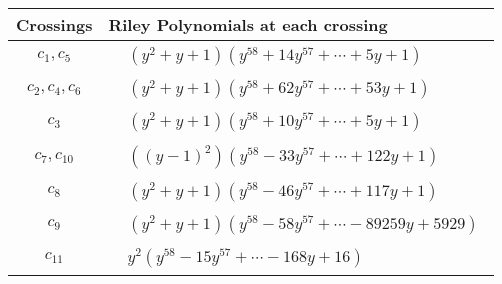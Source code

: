 \documentclass[1p]{elsarticle_modified}
\theoremstyle{definition}
\begin{document}
\begin{tabular}{m{50pt}|m{274pt}}
Crossings & \hspace{64pt}Riley Polynomials at each crossing \\
\hline $$\begin{aligned}c_{1},c_{5}\end{aligned}$$&$\begin{aligned}
&(y^2+y+1)(y^{58}+14 y^{57}+\cdots+5 y+1)
\end{aligned}$\\
\hline $$\begin{aligned}c_{2},c_{4},c_{6}\end{aligned}$$&$\begin{aligned}
&(y^2+y+1)(y^{58}+62 y^{57}+\cdots+53 y+1)
\end{aligned}$\\
\hline $$\begin{aligned}c_{3}\end{aligned}$$&$\begin{aligned}
&(y^2+y+1)(y^{58}+10 y^{57}+\cdots+5 y+1)
\end{aligned}$\\
\hline $$\begin{aligned}c_{7},c_{10}\end{aligned}$$&$\begin{aligned}
&((y-1)^2)(y^{58}-33 y^{57}+\cdots+122 y+1)
\end{aligned}$\\
\hline $$\begin{aligned}c_{8}\end{aligned}$$&$\begin{aligned}
&(y^2+y+1)(y^{58}-46 y^{57}+\cdots+117 y+1)
\end{aligned}$\\
\hline $$\begin{aligned}c_{9}\end{aligned}$$&$\begin{aligned}
&(y^2+y+1)(y^{58}-58 y^{57}+\cdots-89259 y+5929)
\end{aligned}$\\
\hline $$\begin{aligned}c_{11}\end{aligned}$$&$\begin{aligned}
&y^2(y^{58}-15 y^{57}+\cdots-168 y+16)
\end{aligned}$\\
\hline
\end{tabular}
\vskip 2pc
\end{document}
